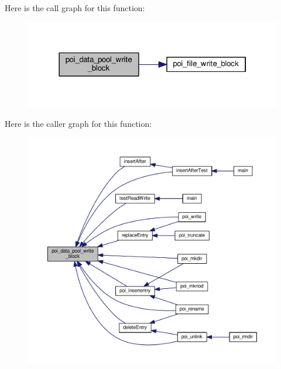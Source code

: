 Here is the call graph for this function\-:\nopagebreak
\begin{figure}[H]
\begin{center}
\leavevmode
\includegraphics[width=322pt]{data-pool-block-manager_8h_a10624f1cbc61dd0a8a03aa94d8502567_cgraph}
\end{center}
\end{figure}




Here is the caller graph for this function\-:\nopagebreak
\begin{figure}[H]
\begin{center}
\leavevmode
\includegraphics[width=350pt]{data-pool-block-manager_8h_a10624f1cbc61dd0a8a03aa94d8502567_icgraph}
\end{center}
\end{figure}


